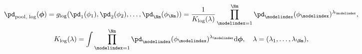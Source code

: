 \begin{equation}
\begin{gathered}
  \pd_{\text{pool, log}}(\boldsymbol{\phi}) =
  g_{\text{log}}(\pd_{1}(\phi_{1}), \pd_{2}(\phi_{2}), \ldots, \pd_{\Nm}(\phi_{\Nm})) =
  \frac{1}{K_{\text{log}}(\lambda)}
  \prod_{\modelindex = 1}^{\Nm}
    \pd_{\modelindex}(\phi_{\modelindex})^{\lambda_{\modelindex}}, \\
  K_{\text{log}}(\lambda) = 
  \int
    \prod_{\modelindex = 1}^{\Nm}
    \pd_{\modelindex}(\phi_{\modelindex})^{\lambda_{\modelindex}}
  \text{d}\boldsymbol{\phi},
  \quad
  \lambda = (\lambda_{1}, \ldots, \lambda_{\Nm}),
  \label{eqn:pooled-prior-overall}
\end{gathered}
\end{equation}